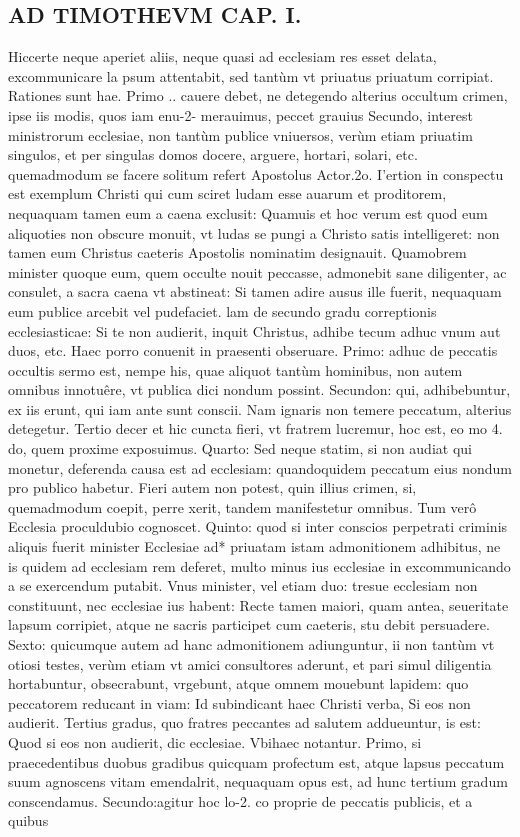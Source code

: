 \documentclass{article}
\begin{document}
\begin{pages}
\section*{AD TIMOTHEVM CAP. I. }
\marginpar{[ p.65 ]}
\marginpar{[ p.66 ]}\pstart Hiccerte neque  aperiet aliis, neque  quasi ad ecclesiam res esset delata, excommunicare la psum attentabit, sed tantùm vt priuatus priuatum corripiat. Rationes sunt hae. Primo .. cauere debet, ne detegendo alterius occultum crimen, ipse iis modis, quos iam enu-2- merauimus, peccet grauius Secundo, interest ministrorum ecclesiae, non tantùm publice vniuersos, verùm etiam priuatim singulos, et per singulas domos docere, arguere, hortari, solari, etc. quemadmodum se facere solitum refert Apostolus Actor.2o. I'ertion in conspectu est exemplum Christi qui cum sciret ludam esse auarum et proditorem, nequaquam tamen eum a caena exclusit: Quamuis et hoc verum est quod eum aliquoties non obscure monuit, vt ludas se pungi a Christo satis intelligeret: non tamen eum Christus caeteris Apostolis nominatim designauit. Quamobrem minister quoque  eum, quem occulte nouit peccasse, admonebit sane diligenter, ac consulet, a sacra caena vt abstineat: Si tamen adire ausus ille fuerit, nequaquam eum publice arcebit vel pudefaciet.  \pend\pstart lam de secundo gradu correptionis ecclesiasticae: Si te non audierit, inquit Christus, adhibe tecum adhuc vnum aut duos, etc. Haec porro conuenit in praesenti obseruare. Primo: adhuc de peccatis occultis sermo est, nempe his, quae aliquot tantùm hominibus, non autem omnibus innotuêre, vt publica dici nondum possint. Secundon: qui, adhibebuntur, ex iis erunt, qui iam ante sunt conscii. Nam ignaris non temere peccatum, alterius detegetur. Tertio decer et hic cuncta fieri, vt fratrem lucremur, hoc est, eo mo 4. do, quem proxime exposuimus. Quarto: Sed neque  statim, si non audiat qui monetur, deferenda causa est ad ecclesiam: quandoquidem peccatum eius nondum pro publico habetur. Fieri autem non potest, quin illius crimen, si, quemadmodum coepit, perre xerit, tandem manifestetur omnibus. Tum verô Ecclesia proculdubio cognoscet. Quinto: quod si inter conscios perpetrati criminis aliquis fuerit minister Ecclesiae ad* priuatam istam admonitionem adhibitus, ne is quidem ad ecclesiam rem deferet, multo minus ius ecclesiae in excommunicando a se exercendum putabit. Vnus minister, vel etiam duo: tresue ecclesiam non constituunt, nec ecclesiae ius habent: Recte tamen maiori, quam antea, seueritate lapsum corripiet, atque  ne sacris participet cum caeteris, stu debit persuadere. Sexto: quicumque  autem ad hanc admonitionem adiunguntur, ii non tantùm vt otiosi testes, verùm etiam vt amici consultores aderunt, et pari simul diligentia hortabuntur, obsecrabunt, vrgebunt, atque  omnem mouebunt lapidem: quo peccatorem reducant in viam: Id subindicant haec Christi verba, Si eos non audierit.  \pend\pstart Tertius gradus, quo fratres peccantes ad salutem addueuntur, is est: Quod si eos non audierit, dic ecclesiae. Vbihaec notantur. Primo, si praecedentibus duobus gradibus quicquam profectum est, atque  lapsus peccatum suum agnoscens vitam emendalrit, nequaquam opus est, ad hunc tertium gradum conscendamus. Secundo:agitur hoc lo-2.  co proprie de peccatis publicis, et a quibus 
\end{pages}
\end{document}
